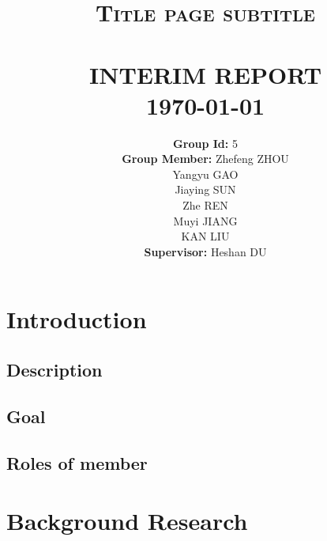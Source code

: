 \documentclass[paper=a4, fontsize=11pt,twoside]{scrartcl}		%
\title{	\normalsize \textsc{Title page subtitle} 	%
		 	\\[2.0cm]													%
			\HRule{0.5pt} \\										%
			\LARGE \textbf{\uppercase{Interim Report}}	%
			\HRule{2pt} \\ [0.5cm]								%
			\normalsize \today									%
		}
\author{
		\textbf{Group Id:} 5\\	
		\textbf{Group Member: } Zhefeng ZHOU\\  Yangyu GAO\\  Jiaying SUN\\ Zhe REN\\  Muyi JIANG\\  KAN LIU\\
		\textbf{Supervisor: } Heshan DU\\
        }
\makeatletter
\def\printtitle{%
    {\centering \@title\par}}
\def\printauthor{%
    {\centering \large \@author}}
\makeatother
\begin{document}
\thispagestyle{empty}				%
\printtitle									%
  	\vfill
\printauthor								%
\cleardoublepage

\newpage
\tableofcontents
\thispagestyle{empty}	
\newpage
\cleardoublepage


\setcounter{page}{1}

\section{Introduction}
\subsection{Description}
\subsection{Goal}
\subsection{Roles of member }


\section{Background Research}
\end{document}
